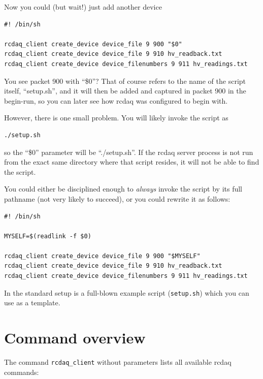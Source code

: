 \documentclass{article}[11pt]
\begin{document}
Now you could (but wait!) just add another device

\begin{verbatim} 
#! /bin/sh

rcdaq_client create_device device_file 9 900 "$0" 
rcdaq_client create_device device_file 9 910 hv_readback.txt 
rcdaq_client create_device device_filenumbers 9 911 hv_readings.txt
\end{verbatim}

You see packet 900 with ``\$0''? That of course refers to the name of
the script itself, ``setup.sh'', and it will then be added and
captured in packet 900 in the begin-run, so you can later see how
rcdaq was configured to begin with.

However, there is one small problem. You will likely invoke the script as 

\begin{verbatim} 
./setup.sh
\end{verbatim}

so the ``\$0'' parameter will be ``./setup.sh''. If the rcdaq server
process is not run from the exact same directory where that script
resides, it will not be able to find the script.

You could either be disciplined enough to \emph{always} invoke the
script by its full pathname (not very likely to succeed), or you could
rewrite it as follows:
\label{setupexample}
\begin{verbatim} 
#! /bin/sh

MYSELF=$(readlink -f $0)

rcdaq_client create_device device_file 9 900 "$MYSELF"
rcdaq_client create_device device_file 9 910 hv_readback.txt 
rcdaq_client create_device device_filenumbers 9 911 hv_readings.txt
\end{verbatim}

In the standard setup is a full-blown example script (\verb|setup.sh|) which you can use
as a template.


\section{Command overview}
\label{CommandOverview}

The command \verb|rcdaq_client| without parameters lists all available rcdaq commands:
\end{document}
